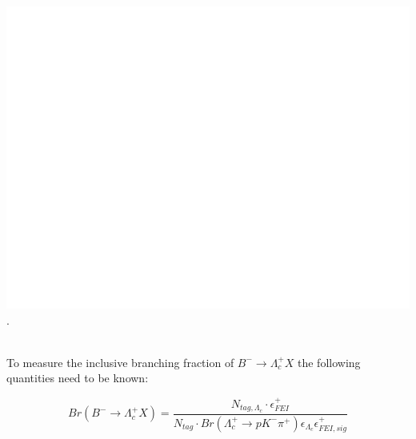 \mbox{\includegraphics[width=.8\textwidth]{04-chargedCorrBtoLambda/figs/blank.png}} %
\vfill
%
\vspace*{10.5cm}
.\\

\mbox{~}

To measure the inclusive branching fraction of $B^-  \rightarrow \Lambda_c^+ X$ the following quantities need to be known: 

\begin{equation}
    Br(B^- \rightarrow \Lambda_c^+ X) = \frac{ N_{tag, \Lambda_c} \cdot  \epsilon^{+}_{FEI}}{N_{tag} \cdot Br(\Lambda_c^+ \rightarrow  p K^- \pi^+) \epsilon_{\Lambda_c} \epsilon^{+}_{FEI,  sig }}
\end{equation}\label{eq:BRformula}

